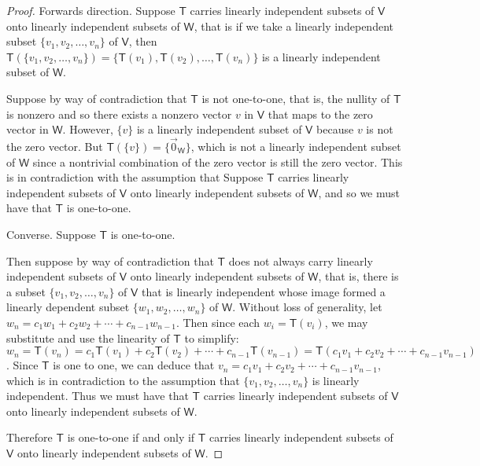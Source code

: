 \documentclass[11pt]{article}
\newcommand{\cbr}[1]{\{#1\}}
\begin{document}
\begin{proof}
    Forwards direction. Suppose $\mathsf{T}$ carries linearly independent subsets of $\mathsf{V}$ onto linearly independent subsets of $\mathsf{W}$, that is if we take a linearly independent subset $\cbr{v_1,v_2,\dots,v_n}$ of $\mathsf{V}$, then \\$\mathsf{T}(\cbr{v_1,v_2,\dots,v_n}) = \cbr{\mathsf{T}(v_1),\mathsf{T}(v_2),\dots,\mathsf{T}(v_n)}$ is a linearly independent subset of $\mathsf{W}$. 
    
    Suppose by way of contradiction that $\mathsf{T}$ is not one-to-one, that is, the nullity of $\mathsf{T}$ is nonzero and so there exists a nonzero vector $v$ in $\mathsf{V}$ that maps to the zero vector in $\mathsf{W}$. However, $\cbr{v}$ is a linearly independent subset of $\mathsf{V}$ because $v$ is not the zero vector. But $\mathsf{T}(\cbr{v}) = \cbr{\vec{0}_{\mathsf{W}}}$, which is not a linearly independent subset of $\mathsf{W}$ since a nontrivial combination of the zero vector is still the zero vector. This is in contradiction with the assumption that Suppose $\mathsf{T}$ carries linearly independent subsets of $\mathsf{V}$ onto linearly independent subsets of $\mathsf{W}$, and so we must have that $\mathsf{T}$ is one-to-one.

    Converse. Suppose $\mathsf{T}$ is one-to-one. 
    
    Then suppose by way of contradiction that $\mathsf{T}$ does not always carry linearly independent subsets of $\mathsf{V}$ onto linearly independent subsets of $\mathsf{W}$, that is, there is a subset $\cbr{v_1,v_2,\dots,v_n}$ of $\mathsf{V}$ that is linearly independent whose image formed a linearly dependent subset $\cbr{w_1,w_2,\dots,w_n}$ of $\mathsf{W}$. Without loss of generality, let $w_n = c_1w_1 + c_2w_2 + \cdots + c_{n-1}w_{n-1}$. Then since each $w_i = \mathsf{T}(v_i)$, we may substitute and use the linearity of $\mathsf{T}$ to simplify: $w_n = \mathsf{T}(v_n) = c_1\mathsf{T}(v_1) + c_2\mathsf{T}(v_2) + \cdots + c_{n-1}\mathsf{T}(v_{n-1}) = \mathsf{T}(c_1v_1 + c_2v_2 + \cdots + c_{n-1}v_{n-1})$. Since $\mathsf{T}$ is one to one, we can deduce that $v_n = c_1v_1 + c_2v_2 + \cdots + c_{n-1}v_{n-1}$, which is in contradiction to the assumption that $\cbr{v_1,v_2,\dots,v_n}$ is linearly independent. Thus we must have that $\mathsf{T}$ carries linearly independent subsets of $\mathsf{V}$ onto linearly independent subsets of $\mathsf{W}$.

    Therefore $\mathsf{T}$ is one-to-one if and only if $\mathsf{T}$ carries linearly independent subsets of $\mathsf{V}$ onto linearly independent subsets of $\mathsf{W}$.
\end{proof}
\end{document}

